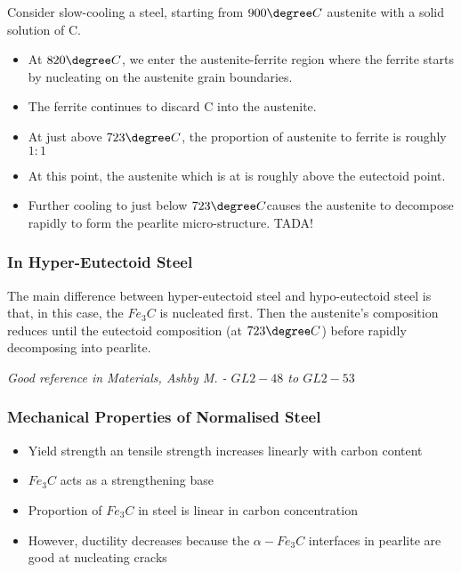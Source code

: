
Consider slow-cooling a  steel, starting from $900 \degree C$ austenite with a solid solution of C.

\begin{itemize}
  \item At $820 \degree C$, we enter the austenite-ferrite region where the ferrite starts by nucleating on the austenite grain boundaries.
  \item The ferrite continues to discard C into the austenite.
  \item At just above $723 \degree C$, the proportion of austenite to ferrite is roughly $1:1$
  \item At this point, the austenite which is at  is roughly above the eutectoid point.
  \item Further cooling to just below $723 \degree C$causes the austenite to decompose rapidly to form the pearlite micro-structure. TADA!
\end{itemize}


\subsubsection{In Hyper-Eutectoid Steel} %
\label{ssub:in_hyper_eutectoid_steel}

The main difference between hyper-eutectoid steel and hypo-eutectoid steel is that, in this case, the $Fe_3C$ is nucleated first. Then the austenite's composition reduces until the eutectoid composition (at $723 \degree C$) before rapidly decomposing into pearlite.



\emph{Good reference in Materials, Ashby M. - $GL2-48$ to $GL2-53$}

\subsubsection{Mechanical Properties of Normalised Steel} %
\label{ssub:mechanical_properties_of_normalised_steel}

\begin{itemize}
  \item Yield strength an tensile strength increases linearly with carbon content
  \item $Fe_3C$ acts as a strengthening base
  \item Proportion of $Fe_3C$ in steel is linear in carbon concentration
  \item However, ductility decreases because the $\alpha-Fe_3C$ interfaces in pearlite are good at nucleating cracks
\end{itemize}

